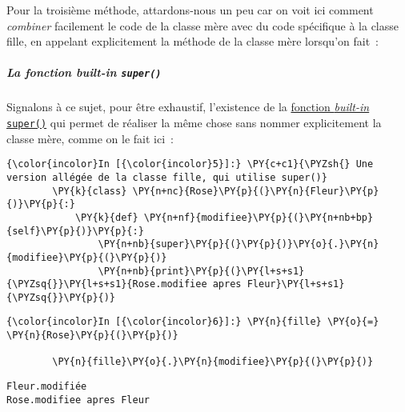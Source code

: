     Pour la troisième méthode, attardons-nous un peu car on voit ici comment
\emph{combiner} facilement le code de la classe mère avec du code
spécifique à la classe fille, en appelant explicitement la méthode de la
classe mère lorsqu'on fait~:

\begin{Shaded}
\begin{Highlighting}[frame=lines,framerule=0.6mm,rulecolor=\color{asisframecolor}]
\NormalTok{)}
\end{Highlighting}
\end{Shaded}

    \hypertarget{la-fonction-built-in-super}{%
\subparagraph{\texorpdfstring{La fonction \emph{built-in}
\texttt{super()}}{La fonction built-in super()}}\label{la-fonction-built-in-super}}

    Signalons à ce sujet, pour être exhaustif, l'existence de la
\href{https://docs.python.org/3/library/functions.html\#super}{fonction
\emph{built-in} \texttt{super()}} qui permet de réaliser la même chose
sans nommer explicitement la classe mère, comme on le fait ici~:

    \begin{Verbatim}[commandchars=\\\{\},frame=single,framerule=0.3mm,rulecolor=\color{cellframecolor}]
{\color{incolor}In [{\color{incolor}5}]:} \PY{c+c1}{\PYZsh{} Une version allégée de la classe fille, qui utilise super()}
        \PY{k}{class} \PY{n+nc}{Rose}\PY{p}{(}\PY{n}{Fleur}\PY{p}{)}\PY{p}{:}
            \PY{k}{def} \PY{n+nf}{modifiee}\PY{p}{(}\PY{n+nb+bp}{self}\PY{p}{)}\PY{p}{:}
                \PY{n+nb}{super}\PY{p}{(}\PY{p}{)}\PY{o}{.}\PY{n}{modifiee}\PY{p}{(}\PY{p}{)}
                \PY{n+nb}{print}\PY{p}{(}\PY{l+s+s1}{\PYZsq{}}\PY{l+s+s1}{Rose.modifiee apres Fleur}\PY{l+s+s1}{\PYZsq{}}\PY{p}{)}
\end{Verbatim}


    \begin{Verbatim}[commandchars=\\\{\},frame=single,framerule=0.3mm,rulecolor=\color{cellframecolor}]
{\color{incolor}In [{\color{incolor}6}]:} \PY{n}{fille} \PY{o}{=} \PY{n}{Rose}\PY{p}{(}\PY{p}{)}
        
        \PY{n}{fille}\PY{o}{.}\PY{n}{modifiee}\PY{p}{(}\PY{p}{)}
\end{Verbatim}


    \begin{Verbatim}[commandchars=\\\{\},frame=single,framerule=0.3mm,rulecolor=\color{cellframecolor}]
Fleur.modifiée
Rose.modifiee apres Fleur
\end{Verbatim}

